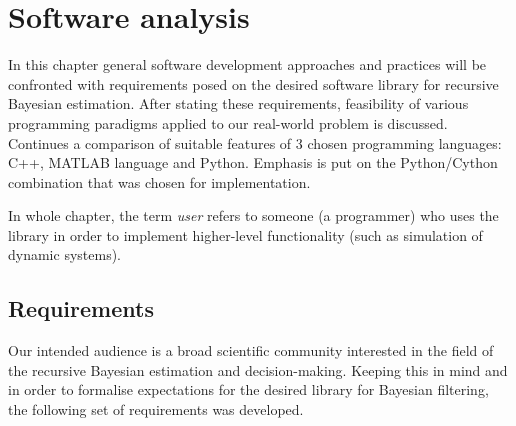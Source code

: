 \chapter{Software analysis}

In this chapter general software development approaches and practices will be confronted with
requirements posed on the desired software library for recursive Bayesian estimation. After stating these
requirements, feasibility of various programming paradigms applied to our real-world problem is
discussed. Continues a comparison of suitable features of 3 chosen programming
languages: C++, MATLAB language and Python. Emphasis is put on the Python/Cython combination that was
chosen for implementation.

In whole chapter, the term \emph{user} refers to someone (a programmer) who uses the library in
order to implement higher-level functionality (such as simulation of dynamic systems).

\section{Requirements}

Our intended audience is a broad scientific community interested in the field of the recursive
Bayesian estimation and decision-making. Keeping this in mind and in order to formalise expectations for
the desired library for Bayesian filtering, the following set of requirements was developed.

